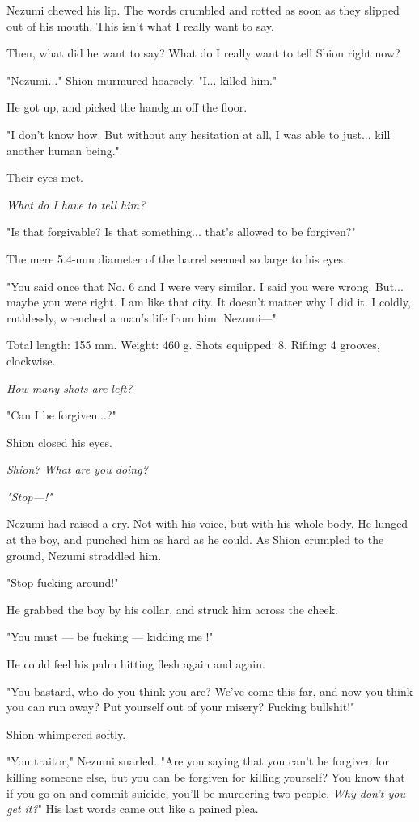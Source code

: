 Nezumi chewed his lip. The words crumbled and rotted as soon as they
slipped out of his mouth. This isn't what I really want to say.

Then, what did he want to say? What do I really want to tell Shion right
now?

"Nezumi..." Shion murmured hoarsely. "I... killed him."

He got up, and picked the handgun off the floor.

"I don't know how. But without any hesitation at all, I was able to
just... kill another human being."

Their eyes met.

\emph{What do I have to tell him?}

"Is that forgivable? Is that something... that's allowed to be
forgiven?"

The mere 5.4-mm diameter of the barrel seemed so large to his eyes.

"You said once that No. 6 and I were very similar. I said you were
wrong. But... maybe you were right. I am like that city. It doesn't
matter why I did it. I coldly, ruthlessly, wrenched a man's life from
him. Nezumi---"

Total length: 155 mm. Weight: 460 g. Shots equipped: 8. Rifling: 4
grooves, clockwise.

\emph{How many shots are left?}

"Can I be forgiven...?"

Shion closed his eyes.

\emph{Shion? What are you doing?}

\emph{"Stop---!"}

Nezumi had raised a cry. Not with his voice, but with his whole body. He
lunged at the boy, and punched him as hard as he could. As Shion
crumpled to the ground, Nezumi straddled him.

"Stop fucking around!"

He grabbed the boy by his collar, and struck him across the cheek.

"You must --- be fucking --- kidding me !"

He could feel his palm hitting flesh again and again.

"You bastard, who do you think you are? We've come this far, and now you
think you can run away? Put yourself out of your misery? Fucking
bullshit!"

Shion whimpered softly.

"You traitor," Nezumi snarled. "Are you saying that you can't be
forgiven for killing someone else, but you can be forgiven for killing
yourself? You know that if you go on and commit suicide, you'll be
murdering two people. \emph{Why don't you get it?}" His last words came out
like a pained plea.

